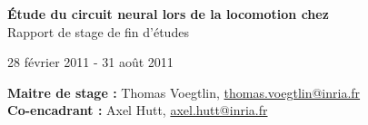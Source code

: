 
\vspace*{\fill}
\begin{center}
   \textbf{ {\Huge Étude du circuit neural lors de la locomotion chez \caeleg{}}}\\[0.5em]{\huge Rapport de stage de fin d'études}
\end{center}

\begin{center}
  28 février 2011 - 31 août 2011
\end{center}

\begin{center}
   \textbf{Maitre de stage :} Thomas Voegtlin, \url{thomas.voegtlin@inria.fr}\\
\textbf{Co-encadrant :} Axel Hutt, \url{axel.hutt@inria.fr}
\end{center}

\vspace*{\fill}

\newpage

